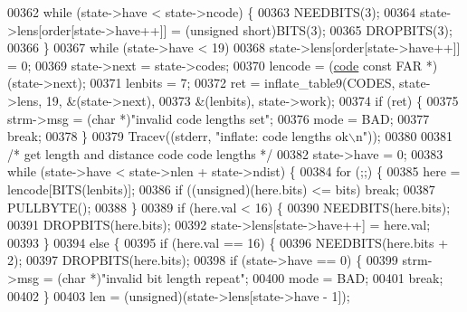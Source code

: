 \begin{DoxyCode}
{{{{{{{{00362             \textcolor{keywordflow}{while} (state->have < state->ncode) \{
00363                 NEEDBITS(3);
00364                 state->lens[order[state->have++]] = (\textcolor{keywordtype}{unsigned} short)BITS(3);
00365                 DROPBITS(3);
00366             \}
00367             \textcolor{keywordflow}{while} (state->have < 19)
00368                 state->lens[order[state->have++]] = 0;
00369             state->next = state->codes;
00370             lencode = (\hyperlink{structcode}{code} \textcolor{keyword}{const} FAR *)(state->next);
00371             lenbits = 7;
00372             ret = inflate\_table9(CODES, state->lens, 19, &(state->next),
00373                                 &(lenbits), state->work);
00374             \textcolor{keywordflow}{if} (ret) \{
00375                 strm->msg = (\textcolor{keywordtype}{char} *)\textcolor{stringliteral}{"invalid code lengths set"};
00376                 mode = BAD;
00377                 \textcolor{keywordflow}{break};
00378             \}
00379             Tracev((stderr, \textcolor{stringliteral}{"inflate:       code lengths ok\(\backslash\)n"}));
00380 
00381             \textcolor{comment}{/* get length and distance code code lengths */}
00382             state->have = 0;
00383             \textcolor{keywordflow}{while} (state->have < state->nlen + state->ndist) \{
00384                 \textcolor{keywordflow}{for} (;;) \{
00385                     here = lencode[BITS(lenbits)];
00386                     \textcolor{keywordflow}{if} ((\textcolor{keywordtype}{unsigned})(here.bits) <= bits) \textcolor{keywordflow}{break};
00387                     PULLBYTE();
00388                 \}
00389                 \textcolor{keywordflow}{if} (here.val < 16) \{
00390                     NEEDBITS(here.bits);
00391                     DROPBITS(here.bits);
00392                     state->lens[state->have++] = here.val;
00393                 \}
00394                 \textcolor{keywordflow}{else} \{
00395                     \textcolor{keywordflow}{if} (here.val == 16) \{
00396                         NEEDBITS(here.bits + 2);
00397                         DROPBITS(here.bits);
00398                         \textcolor{keywordflow}{if} (state->have == 0) \{
00399                             strm->msg = (\textcolor{keywordtype}{char} *)\textcolor{stringliteral}{"invalid bit length repeat"};
00400                             mode = BAD;
00401                             \textcolor{keywordflow}{break};
00402                         \}
00403                         len = (unsigned)(state->lens[state->have - 1]);
}}}}}}}}
\end{DoxyCode}
